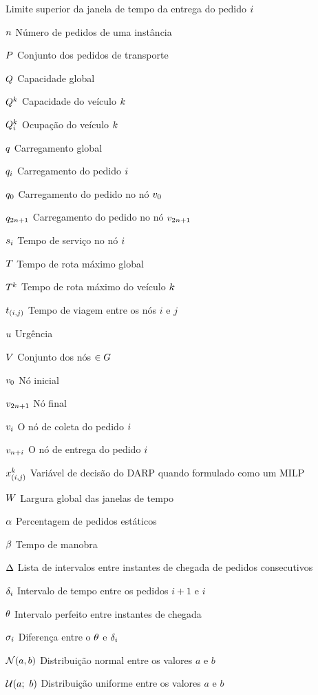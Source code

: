 \begin{simbolos}
      Limite superior da janela de tempo da entrega do pedido $i$
    \item[$n$] Número de pedidos de uma instância
    \item[$P$] Conjunto dos pedidos de transporte 
    \item[$Q$] Capacidade global
    \item[$Q^{k}$] Capacidade do veículo $k$
    \item[$Q^{k}_i$] Ocupação do veículo $k$
    \item[$q$] Carregamento global
    \item[$q_i$] Carregamento do pedido $i$
    \item[$q_{0}$] Carregamento do pedido no nó $v_{0}$
    \item[$q_{2n + 1}$]
     Carregamento do pedido no nó $v_{2n + 1}$
    \item[$s_{i}$]
      Tempo de serviço no nó $i$
    \item[$T$] Tempo de rota máximo global
    \item[$T^k$] Tempo de rota máximo do veículo $k$
    \item[$t_{(i,j)}$] Tempo de viagem entre os nós $i$ e $j$
    \item[$u$] Urgência
    \item[$V$] Conjunto dos nós $\in G$
    \item[$v_{0}$] Nó inicial
    \item[$v_{2n + 1}$] Nó final 
    \item[$v_{i}$] O nó de coleta do pedido $i$
    \item[$v_{n + i}$] O nó de entrega do pedido $i$
    \item[$x_{(i, j)}^{k}$] Variável de decisão do DARP quando formulado
      como um MILP
    \item[$W$] Largura global das janelas de tempo 
    \item[$\alpha$] Percentagem de pedidos estáticos
    \item[$\beta$] Tempo de manobra
    \item[$\Delta$]
      Lista de intervalos entre instantes de chegada de pedidos 
      consecutivos
    \item[$\delta_i$]
      Intervalo de tempo entre os pedidos $i + 1$ e $i$
    \item[$\theta$] Intervalo perfeito entre instantes de chegada
    \item[$\sigma_i$]
      Diferença entre o $\theta$ e 
      $\delta_i$
    \item[$\mathcal{N}(a,b)$]
       Distribuição normal entre os valores $a$ e $b$
    \item[$\mathcal{U}(a;\ b)$]
      Distribuição uniforme entre os valores $a$ e $b$
\end{simbolos}
